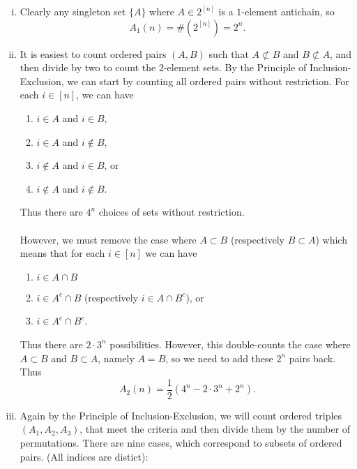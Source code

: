 \documentclass{article}
\newenvironment{solution}[1][Solution.]{\begin{trivlist}
\item[\hskip \labelsep {\bfseries #1}]}{\end{trivlist}}
\begin{document}
\begin{solution} \text{}
  \begin{enumerate}[(i)]
    \item Clearly any singleton set $\{ A \}$ where $A \in 2^{[n]}$ is a $1$-element antichain, so \[
      A_1(n) = \#(2^{[n]}) = 2^n.
    \]
    \item It is easiest to count ordered pairs $(A, B)$ such that
    $A \not\subset B$ and $B \not\subset A$, and then divide by two
    to count the $2$-element sets. By the Principle of Inclusion-Exclusion,
    we can start by counting all ordered pairs without restriction.
    For each $i \in [n]$, we can have \begin{enumerate}[(1)]
      \item $i \in A$ and $i \in B$,
      \item $i \in A$ and $i \not\in B$,
      \item $i \not\in A$ and $i \in B$, or
      \item $i \not\in A$ and $i \not\in B$.
    \end{enumerate}
    Thus there are $4^n$ choices of sets without restriction.
    \\~\\
    However, we must remove the case where $A \subset B$ (respectively
    $B \subset A$) which means that for each $i \in [n]$ we can have
    \begin{enumerate}[(1)]
      \item $i \in A \cap B$
      \item $i \in A^c \cap B$ (respectively $i \in A \cap B^c$), or
      \item $i \in A^c \cap B^c$.
    \end{enumerate}
    Thus there are $2\cdot3^n$ possibilities.
    However, this double-counts the case where $A \subset B$ and $B \subset A$, namely $A = B$, so we need to add these $2^n$ pairs back.
    Thus \[
      A_2(n) = \frac12(4^n - 2\cdot3^n + 2^n).
    \]
    \item Again by the Principle of Inclusion-Exclusion, we will count ordered
    triples $(A_1, A_2, A_3)$, that meet the criteria and then divide them by
    the number of permutations.
    There are nine cases, which correspond to subsets of ordered pairs.
    (All indices are distict):

\end{enumerate}
\end{solution}
\end{document}
